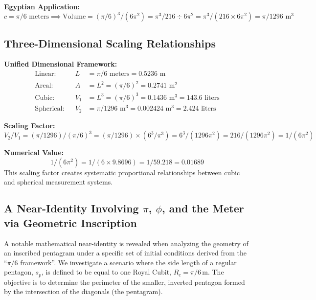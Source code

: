 \documentclass[11pt]{article}
\begin{document}
\textbf{Egyptian Application:}
\[ c = \pi/6 \text{ meters} \implies \text{Volume} = (\pi/6)^3/(6\pi^2) = \pi^3/216 \div 6\pi^2 = \pi^3/(216 \times 6\pi^2) = \pi/1296 \text{ m}^3 \]

\subsection{Three-Dimensional Scaling Relationships}
\textbf{Unified Dimensional Framework:}
\begin{align*}
\text{Linear:}    && L &= \pi/6 \text{ meters} = 0.5236 \text{ m} \\
\text{Areal:}     && A &= L^2 = (\pi/6)^2 = 0.2741 \text{ m}^2 \\
\text{Cubic:}     && V_1 &= L^3 = (\pi/6)^3 = 0.1436 \text{ m}^3 = 143.6 \text{ liters} \\
\text{Spherical:} && V_2 &= \pi/1296 \text{ m}^3 = 0.002424 \text{ m}^3 = 2.424 \text{ liters}
\end{align*}

\textbf{Scaling Factor:}
\[ V_2/V_1 = (\pi/1296) / (\pi/6)^3 = (\pi/1296) \times (6^3/\pi^3) = 6^3/(1296\pi^2) = 216/(1296\pi^2) = 1/(6\pi^2) \]

\textbf{Numerical Value:}
\[ 1/(6\pi^2) = 1/(6 \times 9.8696) = 1/59.218 = 0.01689 \]
This scaling factor creates systematic proportional relationships between cubic and spherical measurement systems.

\subsection{A Near-Identity Involving $\pi$, $\phi$, and the Meter via Geometric Inscription}
\label{sec:derivation_pentagon_meter}

A notable mathematical near-identity is revealed when analyzing the geometry of an inscribed pentagram under a specific set of initial conditions derived from the ``$\pi/6$ framework''. We investigate a scenario where the side length of a regular pentagon, $s_p$, is defined to be equal to one Royal Cubit, $R_c = \pi/6\,\text{m}$. The objective is to determine the perimeter of the smaller, inverted pentagon formed by the intersection of the diagonals (the pentagram).
\end{document}

